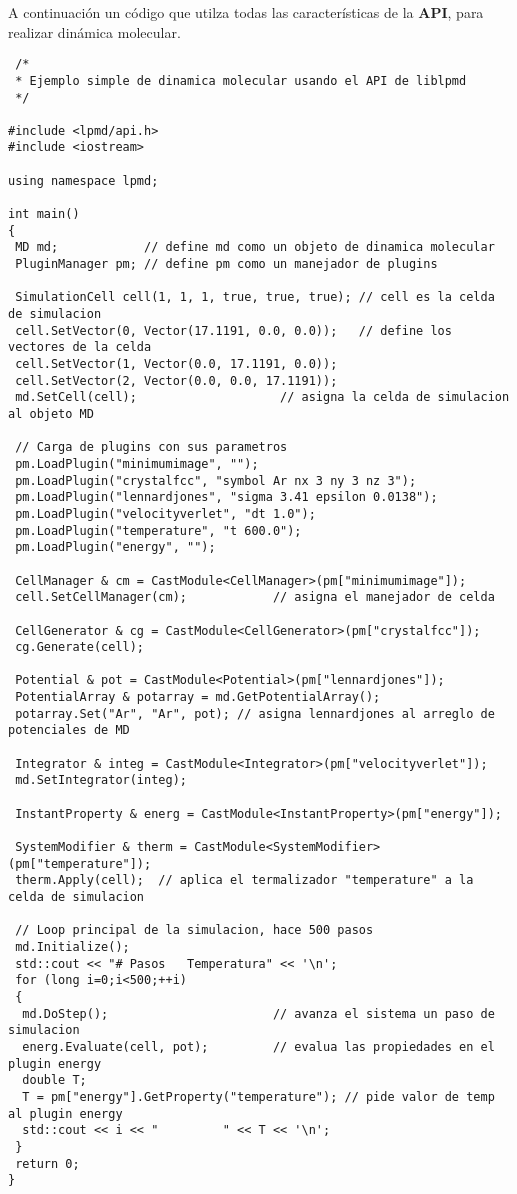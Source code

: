 A continuaci\'on un c\'odigo que utilza todas las caracter\'isticas de la \textbf{API}, para realizar din\'amica molecular.

\begin{verbatim}
 /*
 * Ejemplo simple de dinamica molecular usando el API de liblpmd
 */

#include <lpmd/api.h>
#include <iostream>

using namespace lpmd;

int main()
{
 MD md;            // define md como un objeto de dinamica molecular
 PluginManager pm; // define pm como un manejador de plugins

 SimulationCell cell(1, 1, 1, true, true, true); // cell es la celda de simulacion
 cell.SetVector(0, Vector(17.1191, 0.0, 0.0));   // define los vectores de la celda
 cell.SetVector(1, Vector(0.0, 17.1191, 0.0));
 cell.SetVector(2, Vector(0.0, 0.0, 17.1191));
 md.SetCell(cell);                    // asigna la celda de simulacion al objeto MD 

 // Carga de plugins con sus parametros
 pm.LoadPlugin("minimumimage", "");
 pm.LoadPlugin("crystalfcc", "symbol Ar nx 3 ny 3 nz 3");
 pm.LoadPlugin("lennardjones", "sigma 3.41 epsilon 0.0138");
 pm.LoadPlugin("velocityverlet", "dt 1.0");
 pm.LoadPlugin("temperature", "t 600.0");
 pm.LoadPlugin("energy", "");

 CellManager & cm = CastModule<CellManager>(pm["minimumimage"]);
 cell.SetCellManager(cm);            // asigna el manejador de celda

 CellGenerator & cg = CastModule<CellGenerator>(pm["crystalfcc"]);
 cg.Generate(cell);

 Potential & pot = CastModule<Potential>(pm["lennardjones"]);
 PotentialArray & potarray = md.GetPotentialArray();
 potarray.Set("Ar", "Ar", pot); // asigna lennardjones al arreglo de potenciales de MD

 Integrator & integ = CastModule<Integrator>(pm["velocityverlet"]);
 md.SetIntegrator(integ);

 InstantProperty & energ = CastModule<InstantProperty>(pm["energy"]);
 
 SystemModifier & therm = CastModule<SystemModifier>(pm["temperature"]);
 therm.Apply(cell);  // aplica el termalizador "temperature" a la celda de simulacion

 // Loop principal de la simulacion, hace 500 pasos
 md.Initialize(); 
 std::cout << "# Pasos   Temperatura" << '\n';
 for (long i=0;i<500;++i)
 {
  md.DoStep();                       // avanza el sistema un paso de simulacion
  energ.Evaluate(cell, pot);         // evalua las propiedades en el plugin energy
  double T;
  T = pm["energy"].GetProperty("temperature"); // pide valor de temp al plugin energy
  std::cout << i << "         " << T << '\n';
 }
 return 0;
}
\end{verbatim}

